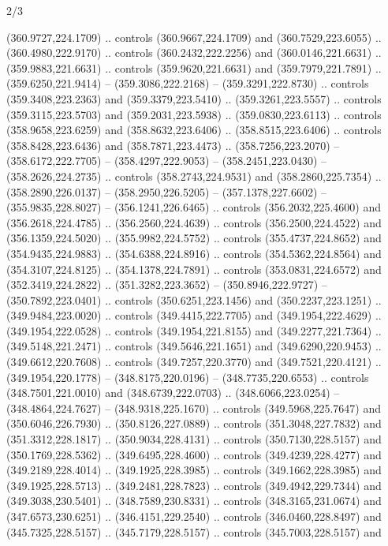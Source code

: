 \begin{flagdescription}{2/3}
\begin{scope}[xshift=0.5\flaglength,yshift=0.5\flagwidth,scale=\flagwidth/495.65]
\begin{scope}[y=0.8pt, x=0.8pt, yscale=-1,shift={(-463.76,-309.78)}]
  (360.9727,224.1709) .. controls (360.9667,224.1709) and (360.7529,223.6055) ..
  (360.4980,222.9170) .. controls (360.2432,222.2256) and (360.0146,221.6631) ..
  (359.9883,221.6631) .. controls (359.9620,221.6631) and (359.7979,221.7891) ..
  (359.6250,221.9414) -- (359.3086,222.2168) -- (359.3291,222.8730) .. controls
  (359.3408,223.2363) and (359.3379,223.5410) .. (359.3261,223.5557) .. controls
  (359.3115,223.5703) and (359.2031,223.5938) .. (359.0830,223.6113) .. controls
  (358.9658,223.6259) and (358.8632,223.6406) .. (358.8515,223.6406) .. controls
  (358.8428,223.6436) and (358.7871,223.4473) .. (358.7256,223.2070) --
  (358.6172,222.7705) -- (358.4297,222.9053) -- (358.2451,223.0430) --
  (358.2626,224.2735) .. controls (358.2743,224.9531) and (358.2860,225.7354) ..
  (358.2890,226.0137) -- (358.2950,226.5205) -- (357.1378,227.6602) --
  (355.9835,228.8027) -- (356.1241,226.6465) .. controls (356.2032,225.4600) and
  (356.2618,224.4785) .. (356.2560,224.4639) .. controls (356.2500,224.4522) and
  (356.1359,224.5020) .. (355.9982,224.5752) .. controls (355.4737,224.8652) and
  (354.9435,224.9883) .. (354.6388,224.8916) .. controls (354.5362,224.8564) and
  (354.3107,224.8125) .. (354.1378,224.7891) .. controls (353.0831,224.6572) and
  (352.3419,224.2822) .. (351.3282,223.3652) -- (350.8946,222.9727) --
  (350.7892,223.0401) .. controls (350.6251,223.1456) and (350.2237,223.1251) ..
  (349.9484,223.0020) .. controls (349.4415,222.7705) and (349.1954,222.4629) ..
  (349.1954,222.0528) .. controls (349.1954,221.8155) and (349.2277,221.7364) ..
  (349.5148,221.2471) .. controls (349.5646,221.1651) and (349.6290,220.9453) ..
  (349.6612,220.7608) .. controls (349.7257,220.3770) and (349.7521,220.4121) ..
  (349.1954,220.1778) -- (348.8175,220.0196) -- (348.7735,220.6553) .. controls
  (348.7501,221.0010) and (348.6739,222.0703) .. (348.6066,223.0254) --
  (348.4864,224.7627) -- (348.9318,225.1670) .. controls (349.5968,225.7647) and
  (350.6046,226.7930) .. (350.8126,227.0889) .. controls (351.3048,227.7832) and
  (351.3312,228.1817) .. (350.9034,228.4131) .. controls (350.7130,228.5157) and
  (350.1769,228.5362) .. (349.6495,228.4600) .. controls (349.4239,228.4277) and
  (349.2189,228.4014) .. (349.1925,228.3985) .. controls (349.1662,228.3985) and
  (349.1925,228.5713) .. (349.2481,228.7823) .. controls (349.4942,229.7344) and
  (349.3038,230.5401) .. (348.7589,230.8331) .. controls (348.3165,231.0674) and
  (347.6573,230.6251) .. (346.4151,229.2540) .. controls (346.0460,228.8497) and
  (345.7325,228.5157) .. (345.7179,228.5157) .. controls (345.7003,228.5157) and

\end{scope}
\end{scope}
\end{flagdescription}
